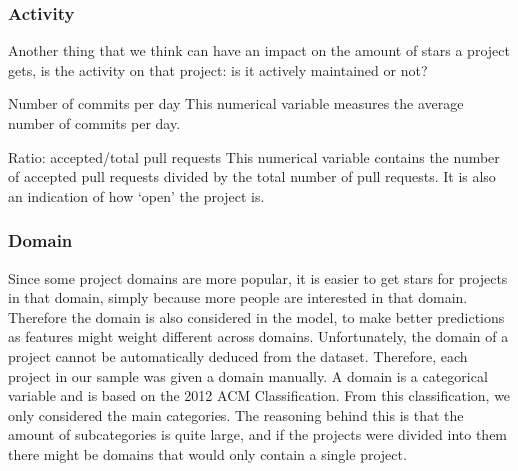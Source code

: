 
    \subsubsection{Activity}
        Another thing that we think can have an impact on the amount of stars a project gets, is the activity on that project: is it actively maintained or not?
    \begin{LaTeXdescription}
        \item[Number of commits per day]
            This numerical variable measures the average number of commits per day.
        \item[Ratio: accepted/total pull requests]
            This numerical variable contains the number of accepted pull requests divided by the total number of pull requests. It is also an indication of how `open' the project is.
    \end{LaTeXdescription}\hspace*{\fill}


 
    \subsubsection{Domain}
        Since some project domains are more popular, it is easier to get stars for projects in that domain, simply because more people are interested in that domain. 
        Therefore the domain is also considered in the model, to make better predictions as features might weight different across domains.
        Unfortunately, the domain of a project cannot be automatically deduced from the dataset.
        Therefore, each project in our sample was given a domain manually.
        A domain is a categorical variable and is based on the 2012 ACM Classification. \cite{acm-2012}
        From this classification, we only considered the main categories.
        The reasoning behind this is that the amount of subcategories is quite large, and if the projects were divided into them there might be domains that would only contain a single project.


